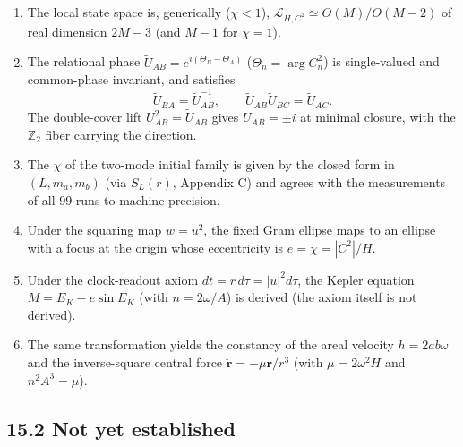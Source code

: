 \documentclass[
  a4paper,
]{article}
\begin{document}
\begin{enumerate}
  For a condensate partition, \(J_{nm}=2Z_n^TK_{nm}Z_m\) satisfies
  \(J_{mn}=-J_{nm}\) and \[
  \dot C_n^2=\sum_{m\ne n}J_{nm},
  \qquad
  \frac{d}{ds}\sum_nC_n^2=0
  \] (the self term vanishes).
\item
  The local state space is, generically (\(\chi<1\)),
  \(\mathcal L_{H,C^2}\simeq O(M)/O(M-2)\) of real dimension \(2M-3\)
  (and \(M-1\) for \(\chi=1\)).
\item
  The relational phase \(\tilde U_{AB}=e^{i(\Theta_B-\Theta_A)}\)
  (\(\Theta_n=\arg C_n^2\)) is single-valued and common-phase invariant,
  and satisfies \[
  \tilde U_{BA}=\tilde U_{AB}^{-1},
  \qquad
  \tilde U_{AB}\tilde U_{BC}=\tilde U_{AC}.
  \] The double-cover lift \(U_{AB}^2=\tilde U_{AB}\) gives
  \(U_{AB}=\pm i\) at minimal closure, with the \(\mathbb Z_2\) fiber
  carrying the direction.
\item
  The \(\chi\) of the two-mode initial family is given by the closed
  form in \((L,m_a,m_b)\) (via \(S_L(r)\), Appendix C) and agrees with
  the measurements of all 99 runs to machine precision.
\item
  Under the squaring map \(w=u^2\), the fixed Gram ellipse maps to an
  ellipse with a focus at the origin whose eccentricity is
  \(e=\chi=|C^2|/H\).
\item
  Under the clock-readout axiom \(dt=r\,d\tau=|u|^2d\tau\), the Kepler
  equation \(M=E_K-e\sin E_K\) (with \(n=2\omega/A\)) is derived (the
  axiom itself is not derived).
\item
  The same transformation yields the constancy of the areal velocity
  \(h=2ab\omega\) and the inverse-square central force
  \(\ddot{\mathbf r}=-\mu\mathbf r/r^3\) (with \(\mu=2\omega^2H\) and
  \(n^2A^3=\mu\)).
\end{enumerate}

\subsection{15.2 Not yet established}\label{not-yet-established}
\end{document}
